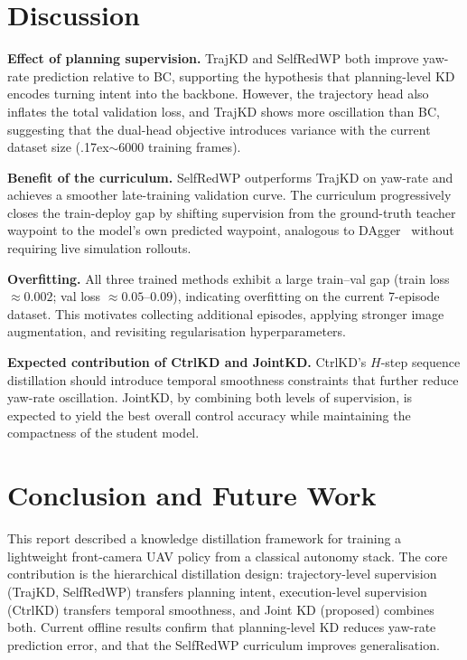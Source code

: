 \documentclass[12pt,a4paper]{article}
\begin{document}
\section{Discussion}

\textbf{Effect of planning supervision.}
TrajKD and SelfRedWP both improve yaw-rate prediction relative to BC, supporting
the hypothesis that planning-level KD encodes turning intent into the backbone.
However, the trajectory head also inflates the total validation loss, and TrajKD
shows more oscillation than BC, suggesting that the dual-head objective introduces
variance with the current dataset size ({\raise.17ex\hbox{$\scriptstyle\sim$}}6000 training frames).

\textbf{Benefit of the curriculum.}
SelfRedWP outperforms TrajKD on yaw-rate and achieves a smoother late-training
validation curve.
The curriculum progressively closes the train-deploy gap by shifting supervision
from the ground-truth teacher waypoint to the model's own predicted waypoint,
analogous to DAgger~\cite{Ross2011} without requiring live simulation rollouts.

\textbf{Overfitting.}
All three trained methods exhibit a large train--val gap (train loss $\approx0.002$;
val loss $\approx0.05$--$0.09$), indicating overfitting on the current 7-episode dataset.
This motivates collecting additional episodes, applying stronger image augmentation,
and revisiting regularisation hyperparameters.

\textbf{Expected contribution of CtrlKD and JointKD.}
CtrlKD's $H$-step sequence distillation should introduce temporal smoothness
constraints that further reduce yaw-rate oscillation.
JointKD, by combining both levels of supervision, is expected to yield the best
overall control accuracy while maintaining the compactness of the student model.

\section{Conclusion and Future Work}

This report described a knowledge distillation framework for training a lightweight
front-camera UAV policy from a classical autonomy stack.
The core contribution is the hierarchical distillation design: trajectory-level
supervision (TrajKD, SelfRedWP) transfers planning intent, execution-level
supervision (CtrlKD) transfers temporal smoothness, and Joint KD (proposed)
combines both.
Current offline results confirm that planning-level KD reduces yaw-rate prediction
error, and that the SelfRedWP curriculum improves generalisation.
\end{document}
